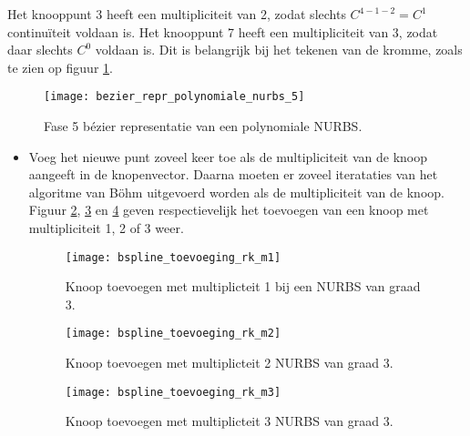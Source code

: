 \documentclass{report}
\begin{document}
\begin{itemize}
{\begin{itemize}
			Het knooppunt 3 heeft een multipliciteit van 2, zodat slechts $C^{4 - 1 - 2} = C^1$ continuïteit voldaan is. Het knooppunt 7 heeft een multipliciteit van 3, zodat daar slechts $C^0$ voldaan is. Dit is belangrijk bij het tekenen van de kromme, zoals te zien op figuur \ref{fig:bezier_repr_polynomiale_nurbs_5}.
			\begin{figure}[ht]
				\centering
				\texttt{[image: bezier\_repr\_polynomiale\_nurbs\_5]}	
				\caption{Fase 5 bézier representatie van een polynomiale NURBS.}
				\label{fig:bezier_repr_polynomiale_nurbs_5}
			\end{figure}
		\end{itemize}}
	{
		\begin{itemize} 
			\item Voeg het nieuwe punt zoveel keer toe als de multipliciteit van de knoop aangeeft in de knopenvector. Daarna moeten er zoveel iterataties van het algoritme van Böhm uitgevoerd worden als de multipliciteit van de knoop. Figuur \ref{fig:bspline_toevoeging_rk_m1}, \ref{fig:bspline_toevoeging_rk_m2} en \ref{fig:bspline_toevoeging_rk_m3} geven respectievelijk het toevoegen van een knoop met multipliciteit 1, 2 of 3 weer.
			\begin{figure}[ht]
				\centering
				\texttt{[image: bspline\_toevoeging\_rk\_m1]}	
				\caption{Knoop toevoegen met multiplicteit 1 bij een NURBS van graad 3.}
				\label{fig:bspline_toevoeging_rk_m1}
			\end{figure}
			\begin{figure}[ht]
				\centering
				\texttt{[image: bspline\_toevoeging\_rk\_m2]}	
				\caption{Knoop toevoegen met multiplicteit 2 NURBS van graad 3.}
				\label{fig:bspline_toevoeging_rk_m2}
			\end{figure}
			\begin{figure}[ht]
				\centering
				\texttt{[image: bspline\_toevoeging\_rk\_m3]}	
				\caption{Knoop toevoegen met multiplicteit 3 NURBS van graad 3.}
				\label{fig:bspline_toevoeging_rk_m3}
			\end{figure}
		\end{itemize}
	}

\end{itemize}
\end{document}

